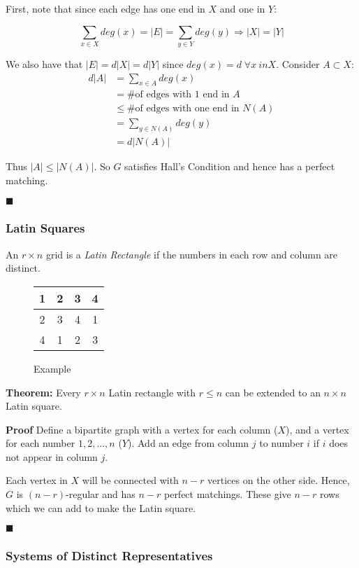 \documentclass[11pt, letterpaper, oneside]{article}
\begin{document}
First, note that since each edge has one end in $X$ and one in $Y$:

$$ \sum_{x \in X} deg(x) = |E| = \sum_{y \in Y}  deg(y) \Rightarrow |X|=|Y| $$

We also have that $|E| = d|X| = d|Y|$ since $deg(x)=d \; \forall x \ in X$. Consider $A \subset X$:
\begin{align*}
	d|A| &=\sum_{x \in A} deg(x) \\
		 &= \text{\# of edges with 1 end in } A \\
		 &\leq \text{\# of edges with one end in } N(A) \\
		 &= \sum_{y \in N(A)} deg(y) \\
		 &= d|N(A)|
\end{align*}

Thus $|A| \leq |N(A)|$. So $G$ satisfies Hall's Condition and hence has a perfect matching.

{\hfill $\blacksquare$}

\subsubsection{Latin Squares}
An $r \times n$ grid is a \textit{Latin Rectangle} if the numbers in each row and column are distinct.

\begin{wrapfigure}{r}{0.15\textwidth}
	\caption*{Example}
	\begin{tabular}{|c|c|c|c|}
		\hline 1 & 2 & 3 & 4 \\ 
		\hline 2 & 3 & 4 & 1 \\ 
		\hline 4 & 1 & 2 & 3 \\ 
		\hline 
	\end{tabular}
\end{wrapfigure}

\textbf{Theorem:} Every $r \times n$ Latin rectangle with $r \leq n$ can be extended to an $n \times n$ Latin square.

\textbf{Proof} Define a bipartite graph with a vertex for each column ($X$), and a vertex for each number $1, 2, ..., n$ ($Y$). Add an edge from column $j$ to number $i$ if $i$ does not appear in column $j$.

Each vertex in $X$ will be connected with $n-r$ vertices on the other side. Hence, $G$ is $(n-r)$-regular and has $n-r$ perfect matchings. These give $n-r$ rows which we can add to make the Latin square.

{\hfill $\blacksquare$}

\subsubsection{Systems of Distinct Representatives}
\end{document}
